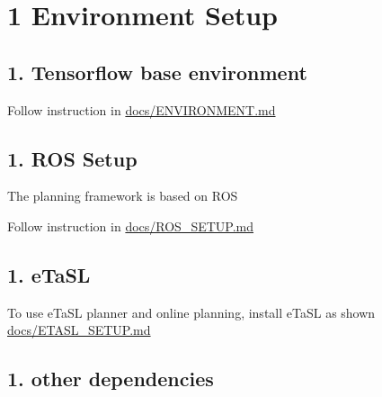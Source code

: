 \section*{1 Environment Setup}

\subsection*{1. Tensorflow base environment}


\begin{DoxyItemize}
\item Follow instruction in \hyperlink{md_docs__e_n_v_i_r_o_n_m_e_n_t}{docs/\+E\+N\+V\+I\+R\+O\+N\+M\+E\+NT.md}
\end{DoxyItemize}

\subsection*{1. R\+OS Setup}


\begin{DoxyItemize}
\item The planning framework is based on R\+OS
\item Follow instruction in \hyperlink{md_docs__r_o_s__s_e_t_u_p}{docs/\+R\+O\+S\+\_\+\+S\+E\+T\+UP.md}
\end{DoxyItemize}

\subsection*{1. e\+Ta\+SL}


\begin{DoxyItemize}
\item To use e\+Ta\+SL planner and online planning, install e\+Ta\+SL as shown \hyperlink{md_docs__e_t_a_s_l__s_e_t_u_p}{docs/\+E\+T\+A\+S\+L\+\_\+\+S\+E\+T\+UP.md}
\end{DoxyItemize}

\subsection*{1. other dependencies}


